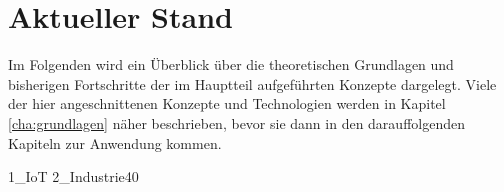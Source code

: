 \chapter{Aktueller Stand}
\label{cha:stand}

Im Folgenden wird ein Überblick über die theoretischen Grundlagen und bisherigen Fortschritte der im Hauptteil aufgeführten Konzepte dargelegt. Viele der hier angeschnittenen Konzepte und Technologien werden in Kapitel \ref{cha:grundlagen} näher beschrieben, bevor sie dann in den darauffolgenden Kapiteln zur Anwendung kommen.

{1_IoT}
{2_Industrie40}
